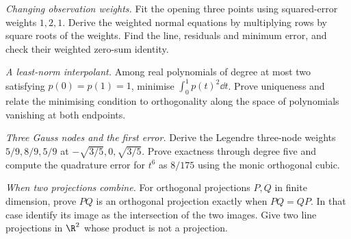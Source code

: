 \begin{exercise}[$\star\star$]\label{ex:v8cDa}
\emph{Changing observation weights.} Fit the opening three points using squared-error weights $1,2,1$. Derive the weighted normal equations by multiplying rows by square roots of the weights. Find the line, residuals and minimum error, and check their weighted zero-sum identity.
\end{exercise}
\begin{exercise}[$\star\star$]\label{ex:v8cDb}
\emph{A least-norm interpolant.} Among real polynomials of degree at most two satisfying $p(0)=p(1)=1$, minimise $\int_0^1p(t)^2\dd t$. Prove uniqueness and relate the minimising condition to orthogonality along the space of polynomials vanishing at both endpoints.
\end{exercise}
\begin{exercise}[$\star\star$]\label{ex:v8cDc}
\emph{Three Gauss nodes and the first error.} Derive the Legendre three-node weights $5/9,8/9,5/9$ at $-\sqrt{3/5},0,\sqrt{3/5}$. Prove exactness through degree five and compute the quadrature error for $t^6$ as $8/175$ using the monic orthogonal cubic.
\end{exercise}
\begin{exercise}[$\star\star$]\label{ex:v8cDd}
\emph{When two projections combine.} For orthogonal projections $P,Q$ in finite dimension, prove $PQ$ is an orthogonal projection exactly when $PQ=QP$. In that case identify its image as the intersection of the two images. Give two line projections in $\R^2$ whose product is not a projection.
\end{exercise}

